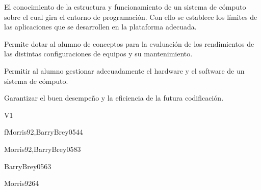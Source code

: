 \begin{syllabus}


\begin{justification}
El conocimiento de la estructura y funcionamiento de un sistema de cómputo sobre el cual gira el entorno de programación. Con ello se establece los límites de las aplicaciones que se desarrollen en la plataforma adecuada.

Permite dotar al alumno de conceptos para la evaluación de los rendimientos de las distintas configuraciones de equipos y su mantenimiento.
\end{justification}

\begin{goals}
\item Permitir al alumno gestionar adecuadamente el hardware y el software de un sistema de cómputo.
\item Garantizar el buen desempeño y la eficiencia de la futura codificación.
\end{goals}

\begin{outcomes}{V1}
    \item {}
    \item {}
\end{outcomes}

\begin{unit}{f\ARDigitallogicanddigitalsystems}{}{Morris92,BarryBrey05}{4}{4}
    \ARDigitallogicanddigitalsystemsAllTopics
    \ARDigitallogicanddigitalsystemsAllLearningOutcomes
\end{unit}

\begin{unit}{\ARMemorysystemorganizationandarchitecture}{}{Morris92,BarryBrey05}{8}{3}
    \ARMemorysystemorganizationandarchitectureAllTopics
    \ARMemorysystemorganizationandarchitectureAllLearningOutcomes
\end{unit}

\begin{unit}{\ARInterfacingandcommunication}{}{BarryBrey05}{6}{3}
    \ARInterfacingandcommunicationAllTopics
    \ARInterfacingandcommunicationAllLearningOutcomes
\end{unit}

\begin{unit}{\ARFunctionalorganization}{}{Morris92}{6}{4}
     \ARFunctionalorganizationAllTopics
     \ARFunctionalorganizationAllLearningOutcomes
\end{unit}


\end{syllabus}
